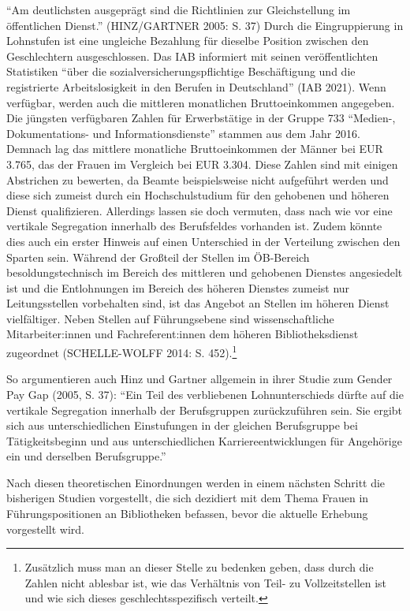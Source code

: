 \documentclass[a4paper,
fontsize=11pt,
oneside,
numbers=noperiodatend,
parskip=half-,
bibliography=totoc,
final
]{scrartcl}
\begin{document}
\enquote{Am deutlichsten ausgeprägt sind die Richtlinien zur
Gleichstellung im öffentlichen Dienst.} (HINZ/GARTNER 2005: S. 37) Durch
die Eingruppierung in Lohnstufen ist eine ungleiche Bezahlung für
dieselbe Position zwischen den Geschlechtern ausgeschlossen. Das IAB
informiert mit seinen veröffentlichten Statistiken \enquote{über die
sozialversicherungspflichtige Beschäftigung und die registrierte
Arbeitslosigkeit in den Berufen in Deutschland} (IAB 2021). Wenn
verfügbar, werden auch die mittleren monatlichen Bruttoeinkommen
angegeben. Die jüngsten verfügbaren Zahlen für Erwerbstätige in der
Gruppe 733 \enquote{Medien-, Dokumentations- und Informationsdienste}
stammen aus dem Jahr 2016. Demnach lag das mittlere monatliche
Bruttoeinkommen der Männer bei EUR 3.765, das der Frauen im Vergleich
bei EUR 3.304. Diese Zahlen sind mit einigen Abstrichen zu bewerten, da
Beamte beispielsweise nicht aufgeführt werden und diese sich zumeist
durch ein Hochschulstudium für den gehobenen und höheren Dienst
qualifizieren. Allerdings lassen sie doch vermuten, dass nach wie vor
eine vertikale Segregation innerhalb des Berufsfeldes vorhanden ist.
Zudem könnte dies auch ein erster Hinweis auf einen Unterschied in der
Verteilung zwischen den Sparten sein. Während der Großteil der Stellen
im ÖB-Bereich besoldungstechnisch im Bereich des mittleren und gehobenen
Dienstes angesiedelt ist und die Entlohnungen im Bereich des höheren
Dienstes zumeist nur Leitungsstellen vorbehalten sind, ist das Angebot
an Stellen im höheren Dienst vielfältiger. Neben Stellen auf
Führungsebene sind wissenschaftliche Mitarbeiter:innen und
Fachreferent:innen dem höheren Bibliotheksdienst zugeordnet
(SCHELLE-WOLFF 2014: S. 452).\footnote{Zusätzlich muss man an dieser
  Stelle zu bedenken geben, dass durch die Zahlen nicht ablesbar ist,
  wie das Verhältnis von Teil- zu Vollzeitstellen ist und wie sich
  dieses geschlechtsspezifisch verteilt.}

So argumentieren auch Hinz und Gartner allgemein in ihrer Studie zum
Gender Pay Gap (2005, S. 37): \enquote{Ein Teil des verbliebenen
Lohnunterschieds dürfte auf die vertikale Segregation innerhalb der
Berufsgruppen zurückzuführen sein. Sie ergibt sich aus unterschiedlichen
Einstufungen in der gleichen Berufsgruppe bei Tätigkeitsbeginn und aus
unterschiedlichen Karriereentwicklungen für Angehörige ein und derselben
Berufsgruppe.}

Nach diesen theoretischen Einordnungen werden in einem nächsten Schritt
die bisherigen Studien vorgestellt, die sich dezidiert mit dem Thema
Frauen in Führungspositionen an Bibliotheken befassen, bevor die
aktuelle Erhebung vorgestellt wird.
\end{document}
